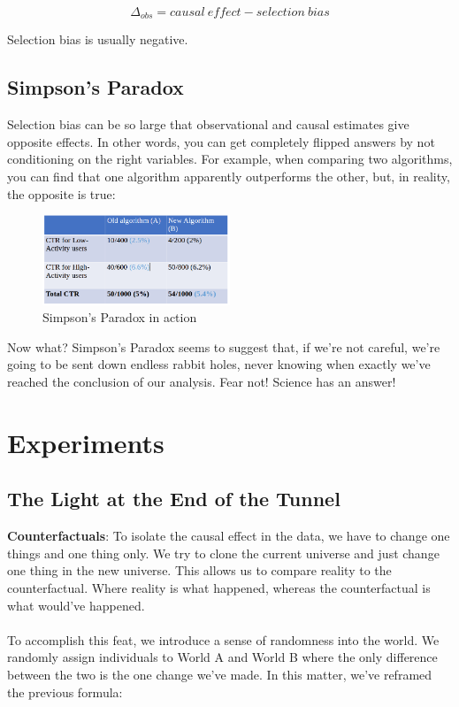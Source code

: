 \begin{equation}
  \Delta_{obs} = causal\ effect - selection\ bias
\end{equation}

Selection bias is usually negative.

\subsection{Simpson's Paradox}
Selection bias can be so large that observational and causal estimates give opposite effects. In other words, you can get completely flipped answers by not conditioning on the right variables. For example, when comparing two algorithms, you can find that one algorithm apparently outperforms the other, but, in reality, the opposite is true:
\begin{figure}[ht]
  \begin{center}
    \includegraphics[width=0.5\textwidth]{figures/fig1.png}
    \caption{ Simpson's Paradox in action }
    \label{fig:fig1}
  \end{center}
\end{figure}
Now what? Simpson's Paradox seems to suggest that, if we're not careful, we're going to be sent down endless rabbit holes, never knowing when exactly we've reached the conclusion of our analysis. Fear not! Science has an answer!

\section{Experiments}
\subsection{The Light at the End of the Tunnel}
\textbf{Counterfactuals}: To isolate the causal effect in the data, we have to change one things and one thing only. We try to clone the current universe and just change one thing in the new universe. This allows us to compare reality to the counterfactual. Where reality is what happened, whereas the counterfactual is what would've happened.  \\ \\
To accomplish this feat, we introduce a sense of randomness into the world. We randomly assign individuals to World A and World B where the only difference between the two is the one change we've made. In this matter, we've reframed the previous formula:

